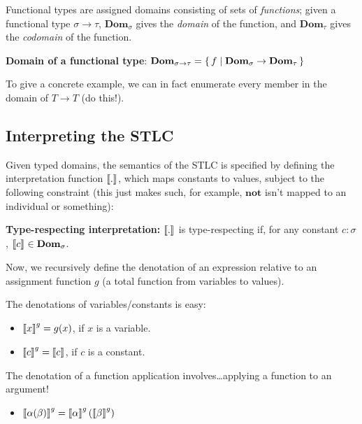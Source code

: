 \documentclass[letterpaper,parskip=half]{scrartcl}
\begin{document}
Functional types are assigned domains consisting of sets of \emph{functions}; given a functional type \(\sigma \to \tau\), \(\mathbf{Dom}_{\sigma }\) gives the \emph{domain} of the function, and \(\mathbf{Dom}_{\tau}\) gives the \emph{codomain} of the function.  

\begin{definition}
\textbf{Domain of a functional type}: \(\mathbf{Dom}_{\sigma \to \tau } = \set{f | \mathbf{Dom}_\sigma \to \mathbf{Dom}_\tau }\)
\end{definition}

To give a concrete example, we can in fact enumerate every member in the domain of \(T \to T\) (do this!).

\subsection{Interpreting the STLC}
\label{sec:org83f0657}

Given typed domains, the semantics of the STLC is specified by defining the interpretation function \(\eval*{.}\), which maps constants to values, subject to the following constraint (this just makes such, for example, \(\mathbf{not}\) isn't mapped to an individual or something):

\begin{definition}
\textbf{Type-respecting interpretation:} \(\eval*{.}\) is type-respecting if, for any constant \(c: \sigma\), \(\eval*{c} \in \mathbf{Dom}_\sigma\). 
\end{definition}

Now, we recursively define the denotation of an expression relative to an assignment function \(g\) (a total function from variables to values).

The denotations of variables/constants is easy:

\begin{itemize}
\item \(\eval*[g]{x} = g(x)\), if \(x\) is a variable.
\item \(\eval*[g]{c} = \eval*{c}\), if \(c\) is a constant.
\end{itemize}

The denotation of a function application involves\ldots{}applying a function to an argument!

\begin{itemize}
\item \(\eval*[g]{\alpha(\beta)} = \eval*[g]{\alpha }(\eval*[g]{\beta })\)
\end{itemize}
\end{document}
